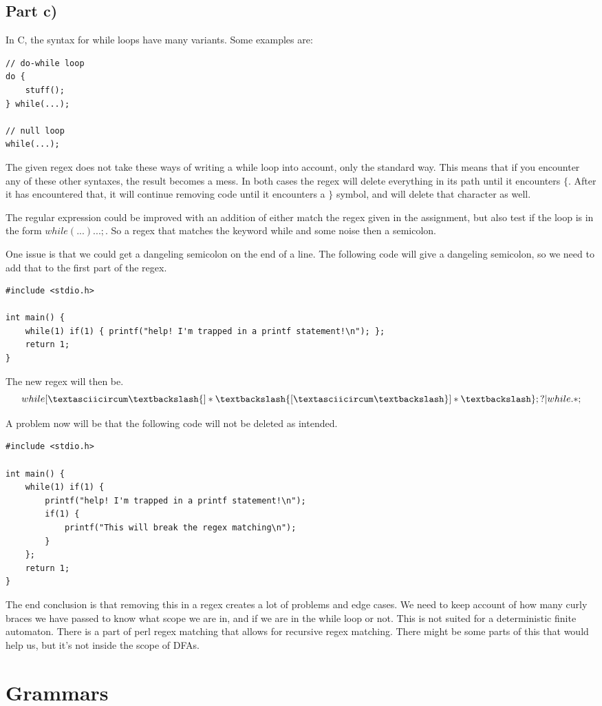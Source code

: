\documentclass[paper=a4, fontsize=11pt]{scrartcl} %
\numberwithin{equation}{section} %
\numberwithin{figure}{section} %
\numberwithin{table}{section} %
\begin{document}
\subsection{Part c)}
In C, the syntax for while loops have many variants. Some examples are:
\begin{lstlisting}
// do-while loop
do {
    stuff();
} while(...);

// null loop
while(...);
\end{lstlisting}

The given regex does not take these ways of writing a while loop into account, only the standard way. This means that if you encounter any of these other syntaxes, the result becomes a mess. In both cases the regex will delete everything in its path until it encounters $\{$. After it has encountered that, it will continue removing code until it encounters a $\}$ symbol, and will delete that character as well.

The regular expression could be improved with an addition of either match the regex given in the assignment, but also test if the loop is in the form $while(...) ... ;$. So a regex that matches the keyword while and some noise then a semicolon.

One issue is that we could get a dangeling semicolon on the end of a line. The following code will give a dangeling semicolon, so we need to add that to the first part of the regex.

\begin{lstlisting}
#include <stdio.h>

int main() {
    while(1) if(1) { printf("help! I'm trapped in a printf statement!\n"); };
    return 1;
}
\end{lstlisting}

The new regex will then be.
$$while[\textasciicircum\textbackslash\{]*\textbackslash\{[\textasciicircum\textbackslash\}]*\textbackslash\};?|while.*;$$

A problem now will be that the following code will not be deleted as intended.
\begin{lstlisting}
#include <stdio.h>

int main() {
    while(1) if(1) {
        printf("help! I'm trapped in a printf statement!\n");
        if(1) {
            printf("This will break the regex matching\n");
        }
    };
    return 1;
}
\end{lstlisting}

The end conclusion is that removing this in a regex creates a lot of problems and edge cases. We need to keep account of how many curly braces we have passed to know what scope we are in, and if we are in the while loop or not. This is not suited for a deterministic finite automaton. There is a part of perl regex matching that allows for recursive regex matching. There might be some parts of this that would help us, but it's not inside the scope of DFAs.

\section{Grammars}
\end{document}
